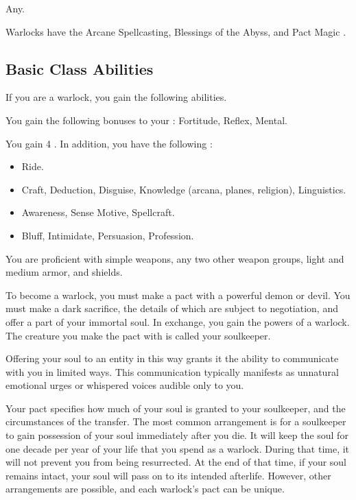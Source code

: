      Any.

     Warlocks have the Arcane Spellcasting, Blessings of the Abyss, and Pact Magic .

    \subsection{Basic Class Abilities}
        If you are a warlock, you gain the following abilities.

        You gain the following bonuses to your :  Fortitude,  Reflex,  Mental.

        You gain 4 .
        In addition, you have the following :
        \begin{itemize}
            \item {} Ride.
            \item {} Craft, Deduction, Disguise, Knowledge (arcana, planes, religion), Linguistics.
            \item {} Awareness, Sense Motive, Spellcraft.
            \item {} Bluff, Intimidate, Persuasion, Profession.
        \end{itemize}

        You are proficient with simple weapons, any two other weapon groups, light and medium armor, and shields.

        To become a warlock, you must make a pact with a powerful demon or devil.
        You must make a dark sacrifice, the details of which are subject to negotiation, and offer a part of your immortal soul.
        In exchange, you gain the powers of a warlock.
        The creature you make the pact with is called your soulkeeper.

        Offering your soul to an entity in this way grants it the ability to communicate with you in limited ways.
        This communication typically manifests as unnatural emotional urges or whispered voices audible only to you.

        Your pact specifies how much of your soul is granted to your soulkeeper, and the circumstances of the transfer.
        The most common arrangement is for a soulkeeper to gain possession of your soul immediately after you die.
        It will keep the soul for one decade per year of your life that you spend as a warlock.
        During that time, it will not prevent you from being resurrected.
        At the end of that time, if your soul remains intact, your soul will pass on to its intended afterlife.
        However, other arrangements are possible, and each warlock's pact can be unique.

